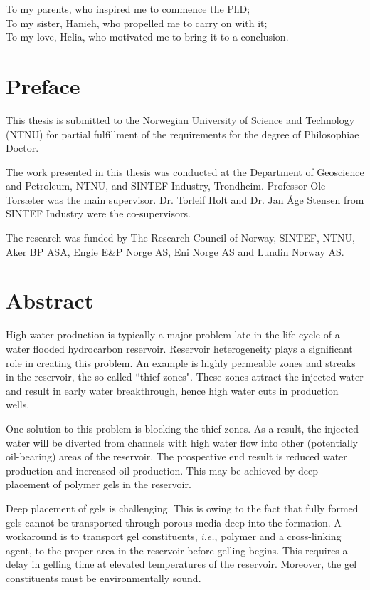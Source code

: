 \begin{dedication}
To my parents, who inspired me to commence the PhD;\\
To my sister, Hanieh, who propelled me to  carry on with it;\\
To my love, Helia, who motivated me to bring it to a conclusion.
\end{dedication}


\clearpage{\thispagestyle{empty}\cleardoublepage}
\setcounter{page}{1}
\chapter*{Preface}

This thesis is submitted to the Norwegian University of Science and Technology (NTNU) for partial fulfillment of the requirements for the degree of Philosophiae Doctor.

The work presented in this thesis was conducted at the Department of Geoscience and Petroleum, NTNU, and SINTEF Industry, Trondheim. Professor Ole Torsæter was the main supervisor. Dr. Torleif Holt and Dr. Jan Åge Stensen from SINTEF Industry were the co-supervisors.

The research was funded by The Research Council of Norway, SINTEF, NTNU, Aker BP ASA, Engie E\&P Norge AS, Eni Norge AS and Lundin Norway AS.



\clearpage{\thispagestyle{empty}\cleardoublepage}
\chapter*{Abstract}

High water production is typically a major problem late in the life cycle of a water flooded hydrocarbon reservoir. Reservoir heterogeneity plays a significant role in creating this problem. An example is highly permeable zones and streaks in the reservoir, the so-called ``thief zones". These zones attract the injected water and result in early water breakthrough, hence high water cuts in production wells. 

One solution to this problem is blocking the thief zones. As a result, the injected water will be diverted from channels with high water flow into other (potentially oil-bearing) areas of the reservoir. The prospective end result is reduced water production and increased oil production.  This may be achieved by deep placement of polymer gels in the reservoir. 

Deep placement of gels is challenging. This is owing to the fact that fully formed gels cannot be transported through porous media deep into the formation. A workaround is to transport gel constituents, \textit{i.e.}, polymer and a cross-linking agent, to the proper area in the reservoir before gelling begins. This requires a delay in gelling time at elevated temperatures of the reservoir. Moreover, the gel constituents must be environmentally sound.

